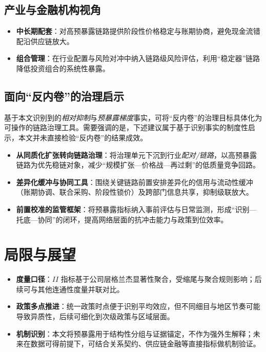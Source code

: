 \subsection{产业与金融机构视角}
\begin{itemize}
  \item \textbf{中长期配套}：对高预暴露链路提供阶段性价格稳定与账期协商，避免现金流错配沿供应链放大。
  \item \textbf{组合管理}：在行业配置与风险对冲中纳入链路级风险评估，利用“稳定器”链路降低投资组合的系统性暴露。
\end{itemize}

\subsection{面向“反内卷”的治理启示}
基于本文识别到的\emph{相对抑制}与\emph{预暴露梯度}事实，可将“反内卷”的治理目标具体化为可操作的链路治理工具。需要强调的是，下述建议属于基于识别事实的制度性启示，本文并未直接检验“反内卷”的结果成效。
\begin{itemize}
  \item \textbf{从同质化扩张转向链路治理}：将治理单元下沉到行业\emph{配对/链路}，以高预暴露链路为优先稳链对象，减少“规模扩张—价格战—再过剩”的低质量竞争回路。
  \item \textbf{差异化缓冲与协同工具}：围绕关键链路前置安排差异化的信用与流动性缓冲（账期协调、联合采购、阶段性锁价）及跨部门信息共享，抑制级联放大。
  \item \textbf{前置校准的监管框架}：将预暴露指标纳入事前评估与日常监测，形成“识别—托底—协同”的闭环，提高网络层面的抗冲击能力与政策到位效率。
\end{itemize}

\section{局限与展望}
\begin{itemize}
  \item \textbf{度量口径}：$II$ 指标基于公司层格兰杰显著性聚合，受缩尾与聚合规则影响；后续可与其他连通性度量并联对比。
  \item \textbf{政策多点推进}：统一政策时点便于识别平均效应，但不同细目与地区节奏可能导致异质性，后续可细化到次级政策与区域层面。
  \item \textbf{机制识别}：本文将预暴露用于结构性分组与证据锚定，不作为强外生解释；未来在数据可得前提下，可结合关系契约、供应链金融等直接指标做机制验证。
\end{itemize}
